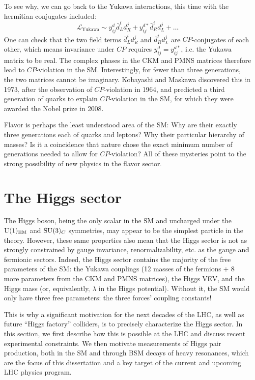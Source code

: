 To see why, we can go back to the Yukawa interactions, this time with the hermitian conjugates included:
\begin{equation}
	\label{eq:01_sm_ew_yukawa_hermitian}
	\mathcal{L}_\mathrm{Yukawa} \sim y^d_{ij} \bar d^i_L d^j_R + y^{d*}_{ij} \bar d^i_R d^j_L + \ldots
\end{equation}
One can check that the two field terms $\bar d^i_L d^j_R$ and $\bar d^i_R d^j_L$ are $CP$-conjugates of each other, which means invariance under $CP$ requires $y^d_{ij} = y^{d*}_{ij}$, i.e. the Yukawa matrix to be real.
The complex phases in the CKM and PMNS matrices therefore lead to $CP$-violation in the SM.
Interestingly, for fewer than three generations, the two matrices cannot be imaginary.
Kobayashi and Maskawa discovered this in 1973, after the observation of $CP$-violation in 1964, and predicted a third generation of quarks to explain $CP$-violation in the SM, for which they were awarded the Nobel prize in 2008.

Flavor is perhaps the least understood area of the SM:
Why are their exactly three generations each of quarks and leptons? 
Why their particular hierarchy of masses?
Is it a coincidence that nature chose the exact minimum number of generations needed to allow for $CP$-violation?
All of these mysteries point to the strong possibility of new physics in the flavor sector.


\section{The Higgs sector}
\label{sec:01_higgs}

The Higgs boson, being the only scalar in the SM and uncharged under the $\UU[1]_\mathrm{EM}$ and $\SU[3]_C$ symmetries, may appear to be the simplest particle in the theory.
However, these same properties also mean that the Higgs sector is not as strongly constrained by gauge invariance, renormalizability, etc. as the gauge and fermionic sectors.
Indeed, the Higgs sector contains the majority of the free parameters of the SM: the Yukawa couplings (12 masses of the fermions $+$ 8 more parameters from the CKM and PMNS matrices), the Higgs VEV, and the Higgs mass (or, equivalently, $\lambda$ in the Higgs potential).
Without it, the SM would only have three free parameters: the three forces' coupling constants!

This is why a significant motivation for the next decades of the LHC, as well as future ``Higgs factory'' colliders, is to precisely characterize the Higgs sector.
In this section, we first describe how this is possible at the LHC and discuss recent experimental constraints.
We then motivate measurements of Higgs pair production, both in the SM and through BSM decays of heavy resonances, which are the focus of this dissertation and a key target of the current and upcoming LHC physics program.

